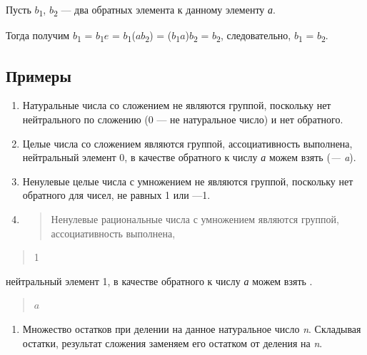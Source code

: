 \documentclass[12pt]{article}
\begin{document}
    Пусть $b$\textsubscript{1}, $b$\textsubscript{2} --- два обратных элемента к
    данному элементу \emph{а}.

    Тогда получим $b$\textsubscript{1} = $b$\textsubscript{1}$e$ =
    $b$\textsubscript{1}($a$$b$\textsubscript{2}) =
    ($b$\textsubscript{1}$a$)$b$\textsubscript{2} = $b$\textsubscript{2},
    следовательно, $b$\textsubscript{1} = $b$\textsubscript{2}.

    \subsection{Примеры}

    \begin{enumerate}
        \item
              Натуральные числа со сложением не являются группой, поскольку нет
              нейтрального по сложению (0 --- не натуральное число) и нет обратного.
        \item
              Целые числа со сложением являются группой, ассоциативность выполнена,
              нейтральный элемент 0, в качестве обратного к числу \emph{а} можем
              взять (\emph{--- a}).
        \item
              Ненулевые целые числа с умножением не являются группой, поскольку нет
              обратного для чисел, не равных 1 или ---1.
        \item
              \begin{quote}
                  Ненулевые рациональные числа с умножением являются группой,
                  ассоциативность выполнена,
              \end{quote}
    \end{enumerate}

    \begin{quote}
        1
    \end{quote}

    нейтральный элемент 1, в качестве обратного к числу \emph{а} можем взять
    .

    \begin{quote}
        $a$
    \end{quote}

    \begin{enumerate}
        \def\labelenumi{\arabic{enumi}.}
        \item
              Множество остатков при делении на данное натуральное число \emph{n}.
              Складывая остатки, результат сложения заменяем его остатком от деления
              на \emph{n}.
    \end{enumerate}
\end{document}
